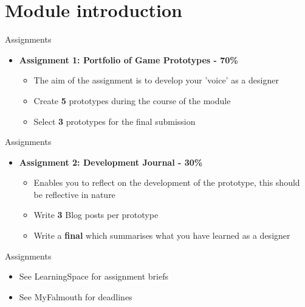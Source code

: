 \part{Module introduction}
\frame{\partpage}

\begin{frame}{Assignments}
	\begin{itemize}
		\item \textbf{Assignment 1: Portfolio of Game Prototypes - 70\%}
			\begin{itemize}
				\item The aim of the assignment is to develop your 'voice' as a designer
				\item Create \textbf{5} prototypes during the course of the module
				\item Select \textbf{3} prototypes for the final submission
			\end{itemize}
	\end{itemize}
\end{frame}

\begin{frame}{Assignments}
	\begin{itemize}
	\item \textbf{Assignment 2: Development Journal - 30\%}
	\begin{itemize}
		\item Enables you to reflect on the development of the prototype, this should be reflective in nature
		\item Write \textbf{3} Blog posts per prototype
		\item Write a \textbf{final} which summarises what you have learned as a designer
	\end{itemize}
\end{itemize}
\end{frame}

\begin{frame}{Assignments}
	\begin{itemize}
		\item See LearningSpace for assignment briefs
		\item See MyFalmouth for deadlines
	\end{itemize}
\end{frame}